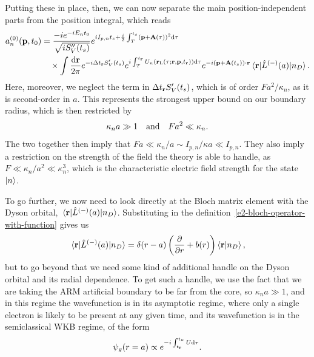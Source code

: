 Putting these in place, then, we can now separate the main position-independent parts from the position integral, which reads
\begin{align}
a_n^{(0)}(\vb{p},\tn)
& =
\frac{-i e^{-iE_n\tn}}{\sqrt{iS_V''(\ts)}}
e^{iI_{p,n} \ts + \frac{i}{2} \int_T^{\ts}\left(\vbp+\vba(\tau)\right)^2\d\tau }
\nonumber \\ & \quad \times
\int\frac{\d\vbr}{2\pi}
e^{-i \Delta\tvr S_V'(\ts)}
e^{i\int_T^{\tvr} U_n(\rl(\tau;\vb{r},\vbp,\tvr))\d\tau}
e^{-i\left(\vbp+\vba(\ts)\right)\cdot\vb{r}}
\matrixel{\vbr}{\hat{L}^{(-)}(a)}{n_D}
.
\label{e2-yield-after-rearrangement}
\end{align}
Here, moreover, we neglect the term  in $\Delta{t_{\ensuremath{\vb{r}}}} S_V'({t_s})$, which is of order $Fa^2/\kappa_n$, as it is second-order in $a$. This represents the strongest upper bound on our boundary radius, which is then restricted by
\begin{equation}
\kappa_n a \gg 1
\qq{and}
Fa^2\ll \kappa_n.
\end{equation}
The two together then imply that $Fa \ll \kappa_n/a \sim I_{p,n}/\kappa a \ll I_{p,n}$. They also imply a restriction on the strength of the field the theory is able to handle, as $F \ll \kappa_n/a^2 \ll \kappa_n^3$, which is the characteristic electric field strength for the state $\ket{n}$.


To go further, we now need to look directly at the Bloch matrix element with the Dyson orbital, $\matrixel{\vbr}{\hat{L}^{(-)}(a)}{n_D}$. Substituting in the definition~\eqref{e2-bloch-operator-with-function} gives us 
\begin{equation}
\matrixel{\vbr}{\hat{L}^{(-)}(a)}{n_D}
=
\delta(r-a)\left( \frac{\partial}{\partial r} + b(r) \right)
\braket{\vbr}{n_D},
\end{equation}
but to go beyond that we need some kind of additional handle on the Dyson orbital and its radial dependence. To get such a handle, we use the fact that we are taking the ARM artificial boundary to be far from the core, so $\kappa_n a \gg 1$, and in this regime the wavefunction is in its asymptotic regime, where only a single electron is likely to be present at any given time, and its wavefunction is in the semiclassical WKB regime, of the form
\begin{equation}
\psi_g(r=a) \propto e^{-i\int_{{t_{\vb{r}}}}^{{t_\kappa}}U\mathrm{d}\tau}.
\label{e2-ground-state-WKB-dependence}
\end{equation}



